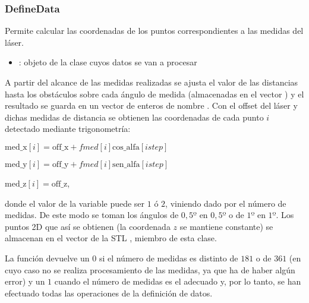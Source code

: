 \subsubsection {DefineData}


\noindent
Permite calcular las coordenadas de los puntos correspondientes a las medidas del láser.

\begin{itemize}
  \item {}: objeto de la clase  cuyos datos se van a procesar
\end{itemize}

\noindent
A partir del alcance de las medidas realizadas se ajusta el valor de las distancias hasta los obstáculos sobre cada ángulo de medida (almacenadas en el vector ) y el resultado se guarda en un vector de enteros de nombre .
\noindent
Con el offset del láser y dichas medidas de distancia se obtienen las coordenadas de cada punto $i$ detectado mediante trigonometría:

$\mbox{med\_x}[i] = \mbox{off\_x}+fmed[i]\mbox{cos\_alfa}[istep]$

$\mbox{med\_y}[i] = \mbox{off\_y}+fmed[i]\mbox{sen\_alfa}[istep]$

$\mbox{med\_z}[i] = \mbox{off\_z}$,

\noindent
donde el valor de la variable  puede ser $1$ ó $2$, viniendo dado por el número de medidas. De este modo se toman los ángulos de $0,5º$ en $0,5º$ o de $1º$ en $1º$.
\noindent
Los puntos 2D que así se obtienen (la coordenada $z$ se mantiene constante) se almacenan en el vector de la STL , miembro de esta clase.

La función devuelve un $0$ si el número de medidas es distinto de $181$ o de $361$ (en cuyo caso no se realiza procesamiento de las medidas, ya que ha de haber algún error) y un $1$ cuando el número de medidas es el adecuado y, por lo tanto, se han efectuado todas las operaciones de la definición de datos.

%
%
%
%

